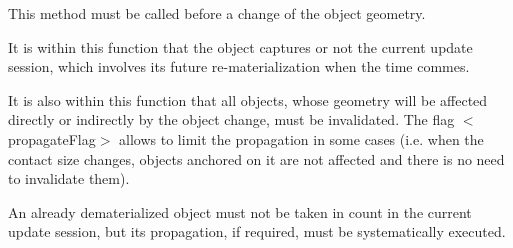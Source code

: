 This method must be called before a change of the object geometry.

It is within this function that the object captures or not the current update session, which involves its future re-\/materialization when the time commes.

It is also within this function that all objects, whose geometry will be affected directly or indirectly by the object change, must be invalidated. The flag {\ttfamily $<$propagate\+Flag$>$} allows to limit the propagation in some cases (i.\+e. when the contact size changes, objects anchored on it are not affected and there is no need to invalidate them).

An already dematerialized object must not be taken in count in the current update session, but its propagation, if required, must be systematically executed.

